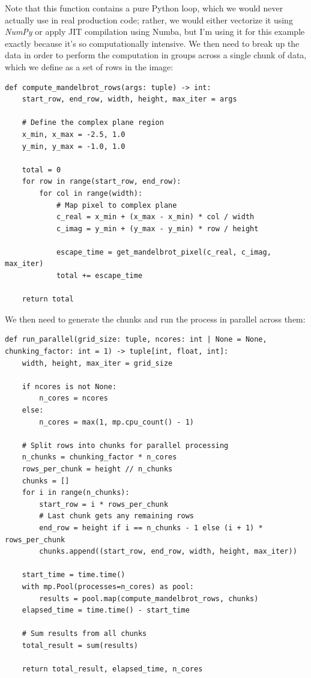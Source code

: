 Note that this function contains a pure Python loop, which we would never actually use in real production code; rather, we would either vectorize it using \textit{NumPy} or apply JIT compilation using Numba, but I'm using it for this example exactly because it's so computationally intensive. We then need to break up the data in order to perform the computation in groups across a single chunk of data, which we define as a set of rows in the image:

\begin{lstlisting}[style=Python]
def compute_mandelbrot_rows(args: tuple) -> int:
    start_row, end_row, width, height, max_iter = args
    
    # Define the complex plane region
    x_min, x_max = -2.5, 1.0
    y_min, y_max = -1.0, 1.0
    
    total = 0
    for row in range(start_row, end_row):
        for col in range(width):
            # Map pixel to complex plane
            c_real = x_min + (x_max - x_min) * col / width
            c_imag = y_min + (y_max - y_min) * row / height
            
            escape_time = get_mandelbrot_pixel(c_real, c_imag, max_iter)
            total += escape_time
    
    return total
\end{lstlisting}

We then need to generate the chunks and run the process in parallel across them:

\begin{lstlisting}[style=Python]
def run_parallel(grid_size: tuple, ncores: int | None = None, chunking_factor: int = 1) -> tuple[int, float, int]:
    width, height, max_iter = grid_size
    
    if ncores is not None:
        n_cores = ncores
    else:
        n_cores = max(1, mp.cpu_count() - 1)
    
    # Split rows into chunks for parallel processing
    n_chunks = chunking_factor * n_cores
    rows_per_chunk = height // n_chunks
    chunks = []
    for i in range(n_chunks):
        start_row = i * rows_per_chunk
        # Last chunk gets any remaining rows
        end_row = height if i == n_chunks - 1 else (i + 1) * rows_per_chunk
        chunks.append((start_row, end_row, width, height, max_iter))
    
    start_time = time.time()
    with mp.Pool(processes=n_cores) as pool:
        results = pool.map(compute_mandelbrot_rows, chunks)
    elapsed_time = time.time() - start_time
    
    # Sum results from all chunks
    total_result = sum(results)
    
    return total_result, elapsed_time, n_cores
\end{lstlisting}

